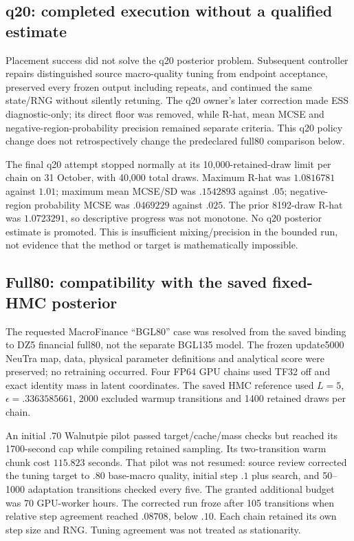 \subsection{q20: completed execution without a qualified estimate}

Placement success did not solve the q20 posterior problem. Subsequent
controller repairs distinguished source macro-quality tuning from endpoint
acceptance, preserved every frozen output including repeats, and continued
the same state/RNG without silently retuning. The q20 owner's later
correction made ESS diagnostic-only; its direct floor was removed, while
R-hat, mean MCSE and negative-region-probability precision remained separate
criteria. This q20 policy change does not retrospectively change the
predeclared full80 comparison below.

The final q20 attempt stopped normally at its 10,000-retained-draw limit
per chain on 31 October, with 40,000 total draws. Maximum R-hat was
$1.0816781$ against $1.01$; maximum mean MCSE/SD was $.1542893$
against $.05$; negative-region probability MCSE was $.0469229$ against
$.025$. The prior 8192-draw R-hat was $1.0723291$, so descriptive
progress was not monotone. No q20 posterior estimate is promoted.
This is insufficient mixing/precision in the bounded run, not evidence
that the method or target is mathematically impossible.

\subsection{Full80: compatibility with the saved fixed-HMC posterior}

The requested MacroFinance ``BGL80'' case was resolved from the saved binding
to DZ5 financial full80, not the separate BGL135 model. The frozen
update5000 NeuTra map, data, physical parameter definitions and analytical
score were preserved; no retraining occurred. Four FP64 GPU chains used
TF32 off and exact identity mass in latent coordinates. The saved HMC
reference used $L=5$, $\epsilon=.3363585661$, 2000 excluded warmup
transitions and 1400 retained draws per chain.

An initial $.70$ Walnutpie pilot passed target/cache/mass checks but reached
its 1700-second cap while compiling retained sampling. Its two-transition
warm chunk cost $115.823$ seconds. That pilot was not resumed: source
review corrected the tuning target to $.80$ base-macro quality, initial
step $.1$ plus search, and 50--1000 adaptation transitions checked every
five. The granted additional budget was 70 GPU-worker hours. The corrected
run froze after 105 transitions when relative step agreement reached
$.08708$, below $.10$. Each chain retained its own step size and RNG.
Tuning agreement was not treated as stationarity.

